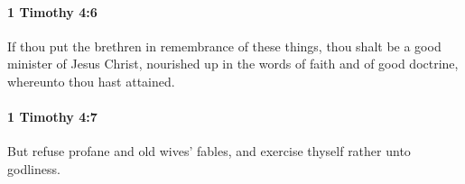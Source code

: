 		\paragraph{1 Timothy 4:6} %
			\label{1TIMOTHY-4-6}

			If thou put the brethren in remembrance of these things, thou shalt be a good minister of Jesus Christ, nourished up in the words of faith and of good doctrine, whereunto thou hast attained.

			\begin{framed}
			\scriptsize
				\begin{compactdesc}
					\item[SBLG] 
				\end{compactdesc}
			\end{framed}

		\paragraph{1 Timothy 4:7} %
			\label{1TIMOTHY-4-7}

			But refuse profane and old wives' fables, and exercise thyself rather unto godliness.

